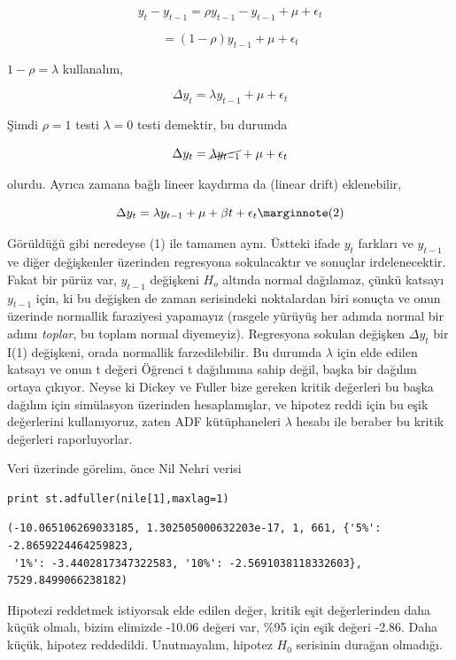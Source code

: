 \documentclass[12pt,fleqn]{article}\usepackage{../../common}
\begin{document}
$$ y_t - y_{t-1} = \rho y_{t-1} - y_{t-1} + \mu + \epsilon_t $$

$$  = (1-\rho) y_{t-1} + \mu + \epsilon_t $$

$1-\rho = \lambda$ kullanalım,

$$ \Delta y_t  = \lambda y_{t-1} + \mu + \epsilon_t $$

Şimdi $\rho = 1$ testi $\lambda=0$ testi demektir, bu durumda

$$ \Delta y_t  = \cancel{\lambda y_{t-1}} + \mu + \epsilon_t $$

olurdu. Ayrıca zamana bağlı lineer kaydırma da (linear drift) eklenebilir, 

$$ \Delta y_t  = \lambda y_{t-1} + \mu + \beta t + \epsilon_t
\mlabel{2}
$$

Görüldüğü gibi neredeyse (1) ile tamamen aynı. Üstteki ifade $y_t$ farkları
ve $y_{t-1}$ ve diğer değişkenler üzerinden regresyona sokulacaktır ve
sonuçlar irdelenecektir.  Fakat bir pürüz var, $y_{t-1}$ değişkeni $H_o$
altında normal dağılamaz, çünkü katsayı $y_{t-1}$ için, ki bu değişken de
zaman serisindeki noktalardan biri sonuçta ve onun üzerinde normallik
faraziyesi yapamayız (rasgele yürüyüş her adımda normal bir adımı
{\em toplar}, bu toplam normal diyemeyiz). Regresyona sokulan değişken
$\Delta y_t$ bir I(1) değişkeni, orada normallik farzedilebilir. Bu durumda
$\lambda$ için elde edilen katsayı ve onun t değeri Öğrenci t dağılımına
sahip değil, başka bir dağılım ortaya çıkıyor. Neyse ki Dickey ve Fuller
bize gereken kritik değerleri bu başka dağılım için simülasyon üzerinden
hesaplamışlar, ve hipotez reddi için bu eşik değerlerini kullanıyoruz,
zaten ADF kütüphaneleri $\lambda$ hesabı ile beraber bu kritik değerleri
raporluyorlar.

Veri üzerinde görelim, önce Nil Nehri verisi

\begin{verbatim}
print st.adfuller(nile[1],maxlag=1)
\end{verbatim}

\begin{verbatim}
(-10.065106269033185, 1.302505000632203e-17, 1, 661, {'5%': -2.8659224464259823,
 '1%': -3.4402817347322583, '10%': -2.5691038118332603}, 7529.8499066238182)
\end{verbatim}

Hipotezi reddetmek istiyorsak elde edilen değer, kritik eşit değerlerinden daha
küçük olmalı, bizim elimizde -10.06 değeri var, \%95 için eşik değeri
-2.86. Daha küçük, hipotez reddedildi. Unutmayalım, hipotez $H_0$ serisinin
durağan olmadığı. 
 
\end{document}
